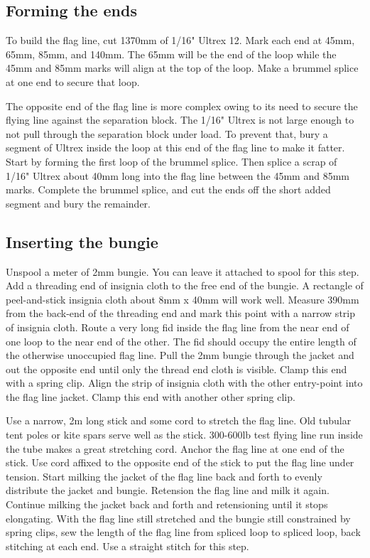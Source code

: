 \documentclass[
]{book}
\begin{document}
\hypertarget{forming-the-ends}{%
\subsection{Forming the ends}\label{forming-the-ends}}

To build the flag line, cut 1370mm of 1/16" Ultrex 12. Mark each end at 45mm, 65mm, 85mm, and 140mm. The 65mm will be the end of the loop while the 45mm and 85mm marks will align at the top of the loop. Make a brummel splice at one end to secure that loop.

The opposite end of the flag line is more complex owing to its need to secure the flying line against the separation block. The 1/16" Ultrex is not large enough to not pull through the separation block under load. To prevent that, bury a segment of Ultrex inside the loop at this end of the flag line to make it fatter. Start by forming the first loop of the brummel splice. Then splice a scrap of 1/16" Ultrex about 40mm long into the flag line between the 45mm and 85mm marks. Complete the brummel splice, and cut the ends off the short added segment and bury the remainder.

\hypertarget{inserting-the-bungie}{%
\subsection{Inserting the bungie}\label{inserting-the-bungie}}

Unspool a meter of 2mm bungie. You can leave it attached to spool for this step. Add a threading end of insignia cloth to the free end of the bungie. A rectangle of peel-and-stick insignia cloth about 8mm x 40mm will work well. Measure 390mm from the back-end of the threading end and mark this point with a narrow strip of insignia cloth. Route a very long fid inside the flag line from the near end of one loop to the near end of the other. The fid should occupy the entire length of the otherwise unoccupied flag line. Pull the 2mm bungie through the jacket and out the opposite end until only the thread end cloth is visible. Clamp this end with a spring clip. Align the strip of insignia cloth with the other entry-point into the flag line jacket. Clamp this end with another other spring clip.

Use a narrow, 2m long stick and some cord to stretch the flag line. Old tubular tent poles or kite spars serve well as the stick. 300-600lb test flying line run inside the tube makes a great stretching cord. Anchor the flag line at one end of the stick. Use cord affixed to the opposite end of the stick to put the flag line under tension. Start milking the jacket of the flag line back and forth to evenly distribute the jacket and bungie. Retension the flag line and milk it again. Continue milking the jacket back and forth and retensioning until it stops elongating. With the flag line still stretched and the bungie still constrained by spring clips, sew the length of the flag line from spliced loop to spliced loop, back stitching at each end. Use a straight stitch for this step.
\end{document}

